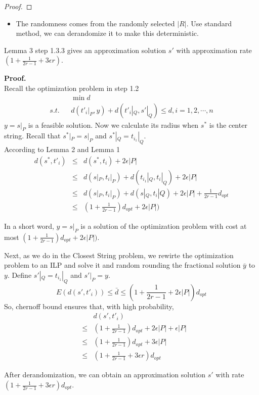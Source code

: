 \documentclass[slidestop,compress,mathserif,10pt]{beamer}
\begin{document}
{\begin{proof}
\end{proof}

\begin{itemize}
	\item The randomness comes from the randomly selected $|R|$. Use standard method, we can derandomize it to make this deterministic.
\end{itemize}

\begin{block}{Lemma 3}
	step 1.3.3 gives an approximation solution $s'$ with approximation rate $(1 + \frac{1}{2r-1} + 3\epsilon r)$.
\end{block}

{\bf Proof.}\\
	Recall the optimization problem in step 1.2
	\begin{eqnarray*}
		&&\min d\\
		s.t. && d(t'_i|_P, y) + d(t'_i|_Q, s'|_Q) \le d, i=1,2,\cdots,n
	\end{eqnarray*}
	$y=s|_P$ is a feasible solution. Now we calculate its radius when $s^*$ is the center string. Recall that $s^*|_P = s|_P$ and $s^*|_Q = t_{i_1}|_Q$.\\
	According to Lemma 2 and Lemma 1
	\begin{eqnarray*}
		d(s^*, t'_i) & \le & d(s^*, t_i) + 2\epsilon|P| \\
		& \le & d(s|_P, t_i|_P) + d(t_{i_1}|_Q, t_i|_Q) + 2\epsilon|P| \\
		& \le & d(s|_P, t_i|_P) + d(s|_Q, t_i|Q) + 2\epsilon|P| + \frac{1}{2r-1}d_{opt}\\
		& \le & (1 + \frac{1}{2r-1})d_{opt} + 2\epsilon|P|)
	\end{eqnarray*}
	
	In a short word, $y=s|_P$ is a solution of the optimization problem with cost at most $ (1 + \frac{1}{2r-1})d_{opt} + 2\epsilon|P|)$.

	Next, as we do in the {\sc Closest String} problem, we rewirte the optimization problem to an ILP and solve it and random rounding the 
	fractional solution $\bar{y}$ to $y$. Define $s'|_Q = t_{i_1}|_Q$ and $s'|_P = y$.\\
	$$E(d(s', t'_i)) \le \bar{d} \le  (1 + \frac{1}{2r-1} + 2\epsilon|P|) d_{opt}$$
	So, chernoff bound ensures that, with high probability, 
	\begin{eqnarray*}
		&& d(s', t'_i)\\
		& \le & (1 + \frac{1}{2r-1})d_{opt} + 2\epsilon|P| + \epsilon|P|\\
		& \le & (1 + \frac{1}{2r-1})d_{opt} + 3\epsilon|P|\\
		& \le & (1 + \frac{1}{2r-1} + 3\epsilon r) d_{opt}
	\end{eqnarray*}
 
	After derandomization, we can obtain an approximation solution $s'$ with rate $ (1 + \frac{1}{2r-1} + 3\epsilon r) d_{opt}$.

}
\end{document}
